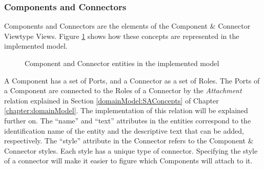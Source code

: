 \documentclass{llncs}
\begin{document}
\subsubsection{Components and Connectors}
\label{subsection:modelComponentsConnectors}
Components and Connectors are the elements of the Component \& Connector Viewtype Views. Figure \ref{figure:modelComponentConnector} shows how these concepts are represented in the implemented model.

\begin{figure}
\centering
\renewcommand {\umltextcolor}{black}
\renewcommand {\umlfillcolor}{none}
\renewcommand {\umldrawcolor}{black}
\caption{Component and Connector entities in the implemented model}
\label{figure:modelComponentConnector}
\end{figure}
 
A Component has a set of Ports, and a Connector as a set of Roles. The Ports of a Component are connected to the Roles of a Connector by the \textit{Attachment} relation explained in Section \ref{domainModel:SAConcepts} of Chapter \ref{chapter:domainModel}. The implementation of this relation will be explained further on. The ``name'' and ``text'' attributes in the entities correspond to the identification name of the entity and the descriptive text that can be added, respectively. The ``style'' attribute in the Connector refers to the Component \& Connector styles. Each style has a unique type of connector. Specifying the style of a connector will make it easier to figure which Components will attach to it.
\end{document}
